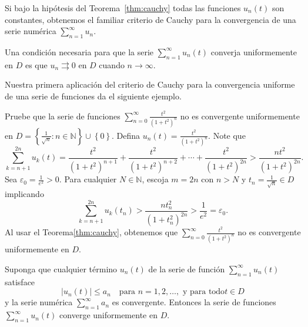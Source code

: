 \begin{remark}
	 Si bajo la hipótesis del Teorema~\ref{thm:cauchy} todas las funciones $u_{n}\left(t\right)$ son constantes, obtenemos el familiar criterio de Cauchy para la convergencia de una serie numérica $\sum_{n=1}^{\infty}u_{n}$.
\end{remark}

\begin{corollary}
	Una condición necesaria para que la serie $\sum_{n=1}^{\infty}u_{n}\left(t\right)$ converja uniformemente en $D$ es que $u_{n}\rightrightarrows0$ en $D$ cuando $n\to\infty$.
\end{corollary}
Nuestra primera aplicación del criterio de Cauchy para la convergencia uniforme de una serie de funciones da el siguiente ejemplo.
\begin{example}
	Pruebe que la serie de funciones $\sum_{n=0}^{\infty}\frac{t^{2}}{{\left(1+t^{2}\right)}^{n}}$ no es convergente uniformemente en $D=\left\{\frac{1}{\sqrt{n}}:n\in\mathds{N}\right\}\cup\left\{0\right\}$. Defina $u_{n}\left(t\right)=\frac{t^{2}}{{\left(1+t^{2}\right)}^{n}}$. Note que \[ \sum_{k=n+1}^{2n}u_{k}\left(t\right)=\frac{t^{2}}{{\left(1+t^{2}\right)}^{n+1}}+\frac{t^{2}}{{\left(1+t^{2}\right)}^{n+2}}+\cdots+\frac{t^{2}}{{\left(1+t^{2}\right)}^{2n}}>\frac{nt^{2}}{{\left(1+t^{2}\right)}^{2n}}. \] Sea $\varepsilon_{0}=\frac{1}{e^{2}}>0$. Para cualquier $N\in\mathds{N}$, escoja $m=2n$ con $n>N$ y $t_{n}=\frac{1}{\sqrt{n}}\in D$ implicando \[ \sum_{k=n+1}^{2n}u_{k}\left(t_{n}\right)>\frac{nt^{2}_{n}}{{\left(1+t^{2}_{n}\right)}^{2n}}>\frac{1}{e^{2}}=\varepsilon_{0}. \] Al usar el Teorema\ref{thm:cauchy}, obtenemos que $\sum_{n=0}^{\infty}\frac{t^{2}}{{\left(1+t^{2}\right)}^{n}}$ no es convergente uniformemente en $D$.
\end{example}
\begin{theorem}\label{thm:weiertraß}
	Suponga que cualquier término $u_{n}\left(t\right)$ de la serie de función $\sum_{n=1}^{\infty}u_{n}\left(t\right)$ satisface \[ \left|u_{n}\left(t\right)\right|\leq a_{n}\quad\text{para }n=1,2,\ldots,\text{ y para todo} t\in D \] y la serie numérica $\sum_{n=1}^{\infty}a_{n}$ es convergente. Entonces la serie de funciones $\sum_{n=1}^{\infty}u_{n}$$\left(t\right)$ converge uniformemente en $D$.
\end{theorem}
